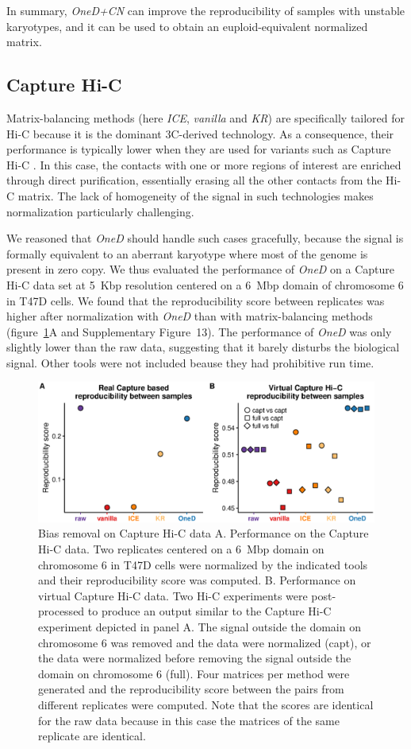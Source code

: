 \documentclass[a4,center,fleqn]{NAR}
\begin{document}
In summary, \textit{OneD+CN} can improve the reproducibility of samples
with unstable karyotypes, and it can be used to obtain an
euploid-equivalent normalized matrix.


\subsection{Capture Hi-C}

Matrix-balancing methods (here \textit{ICE}, \textit{vanilla} and
\textit{KR}) are specifically tailored for Hi-C because it is the dominant
3C-derived technology. As a consequence, their performance is typically
lower when they are used for variants such as Capture Hi-C
\citep{jager2015capture}. In this case, the contacts with one or more
regions of interest are enriched through direct purification, essentially
erasing all the other contacts from the Hi-C matrix. The lack of
homogeneity of the signal in such technologies makes normalization
particularly challenging.

We reasoned that \textit{OneD} should handle such cases gracefully,
because the signal is formally equivalent to an aberrant karyotype where
most of the genome is present in zero copy. We thus evaluated the
performance of \textit{OneD} on a Capture Hi-C data set at 5~Kbp
resolution centered on a 6~Mbp domain of chromosome 6 in T47D cells. We
found that the reproducibility score between replicates was higher after
normalization with \textit{OneD} than with matrix-balancing methods
(figure~\ref{fig:chic}A and Supplementary Figure~13). The performance
of \textit{OneD} was only slightly lower than the raw data, suggesting
that it barely disturbs the biological signal. Other tools were not
included beause they had prohibitive run time.

\begin{figure}
\centerline{\includegraphics[width=.49\textwidth]
  {nar_figures/figure_5.eps}}
\caption{Bias removal on Capture Hi-C data A. Performance on the Capture
Hi-C data. Two replicates centered on a 6~Mbp domain on chromosome 6 in
T47D cells were normalized by the indicated tools and their
reproducibility score was computed. B. Performance on virtual Capture Hi-C
data. Two Hi-C experiments were post-processed to produce an output
similar to the Capture Hi-C experiment depicted in panel A. The signal
outside the domain on chromosome 6 was removed and the data were
normalized (capt), or the data were normalized before removing the signal
outside the domain on chromosome 6 (full). Four matrices per method were
generated and the reproducibility score between the pairs from different
replicates were computed. Note that the scores are identical for the raw
data because in this case the matrices of the same replicate are
identical.}
\label{fig:chic}
\end{figure}
\end{document}
